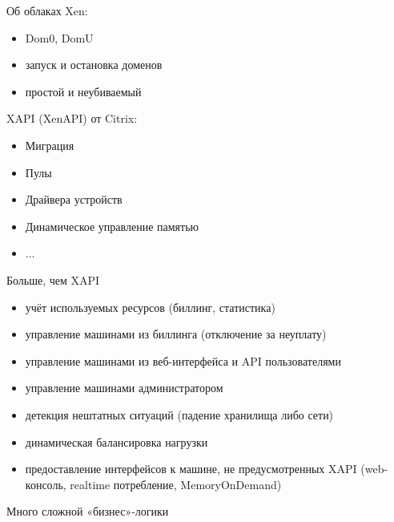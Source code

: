 \documentclass[10pt]{beamer}
\begin{document}
\begin{frame}[plain]
\end{frame}

\begin{frame}{Об облаках}
  Xen:
  \begin{itemize}
  \item Dom0, DomU
  \item запуск и остановка доменов
  \item простой и неубиваемый
  \end{itemize}
  XAPI (XenAPI) от Citrix:
  \begin{itemize}
  \item Миграция
  \item Пулы
  \item Драйвера устройств
  \item Динамическое управление памятью
  \item ...
  \end{itemize}
\end{frame}

\begin{frame}{Больше, чем XAPI}
  \begin{itemize}
  \item учёт используемых ресурсов (биллинг, статистика)
  \item управление машинами из биллинга (отключение за неуплату)
  \item управление машинами из веб-интерфейса и API пользователями
  \item управление машинами администратором
  \item детекция нештатных ситуаций (падение хранилища либо сети)
  \item динамическая балансировка нагрузки
  \item предоставление интерфейсов к машине, не предусмотренных XAPI
    (web-консоль, realtime потребление, MemoryOnDemand)
  \end{itemize}
  Много сложной «бизнес»-логики
\end{frame}
\end{document}
